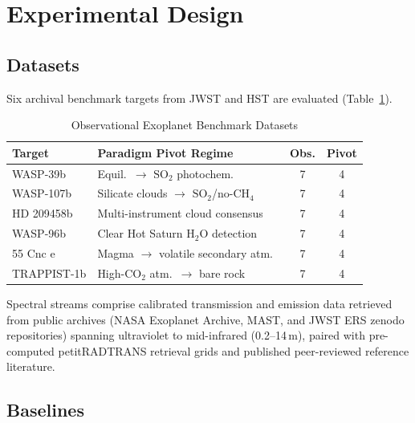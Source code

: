 \documentclass[conference]{IEEEtran}
\begin{document}
\section{Experimental Design}\label{sec:experiments}

\subsection{Datasets}

Six archival benchmark targets from JWST and HST are evaluated (Table~\ref{tab:datasets}).

\begin{table}[htbp]
  \centering
  \caption{Observational Exoplanet Benchmark Datasets}
  \label{tab:datasets}
  \setlength{\tabcolsep}{2pt}
  \footnotesize
  \begin{tabular}{lp{4.1cm}cc}
    \toprule
    \textbf{Target} & \textbf{Paradigm Pivot Regime} & \textbf{Obs.} & \textbf{Pivot} \\
    \midrule
    WASP-39b    & Equil.\ $\to$ $\mathrm{SO}_2$ photochem.~\cite{alderson2023,tsai2023so2} & 7 & 4 \\
    WASP-107b   & Silicate clouds $\to$ $\mathrm{SO}_2$/no-CH$_4$~\cite{dyrek2024} & 7 & 4 \\
    HD 209458b  & Multi-instrument cloud consensus~\cite{sing2016,macdonald2017} & 7 & 4 \\
    WASP-96b    & Clear Hot Saturn $\mathrm{H}_2\mathrm{O}$ detection~\cite{radica2023} & 7 & 4 \\
    55 Cnc e    & Magma $\to$ volatile secondary atm.~\cite{hu2024} & 7 & 4 \\
    TRAPPIST-1b & High-CO$_2$ atm.\ $\to$ bare rock~\cite{greene2023} & 7 & 4 \\
    \bottomrule
  \end{tabular}
\end{table}

Spectral streams comprise calibrated transmission and emission data retrieved from public archives (NASA Exoplanet Archive, MAST, and JWST ERS zenodo repositories) spanning ultraviolet to mid-infrared (0.2--14\,\textmu m), paired with pre-computed petitRADTRANS retrieval grids and published peer-reviewed reference literature.

\subsection{Baselines}
\end{document}
